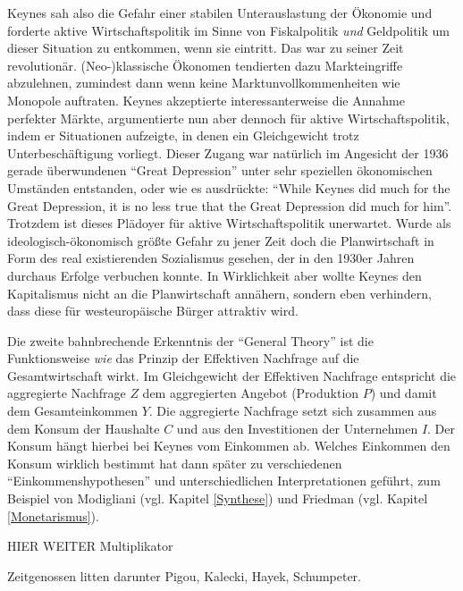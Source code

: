 Keynes sah also die Gefahr einer stabilen Unterauslastung der Ökonomie und forderte aktive Wirtschaftspolitik im Sinne von Fiskalpolitik \textit{und} Geldpolitik um dieser Situation zu entkommen, wenn sie eintritt. Das war zu seiner Zeit revolutionär. (Neo-)klassische Ökonomen tendierten dazu Markteingriffe abzulehnen, zumindest dann wenn keine Marktunvollkommenheiten wie Monopole auftraten. Keynes akzeptierte interessanterweise die Annahme perfekter Märkte, argumentierte nun aber dennoch für aktive Wirtschaftspolitik, indem er Situationen aufzeigte, in denen ein Gleichgewicht trotz Unterbeschäftigung vorliegt. Dieser Zugang war natürlich im Angesicht der 1936 gerade überwundenen "`Great Depression"' unter sehr speziellen ökonomischen Umständen entstanden, oder wie \textcite[S. 199]{Samuelson1946} es ausdrückte: "`While Keynes did much for the Great Depression, it is no less true that the Great Depression did much for him"'. Trotzdem ist dieses Plädoyer für aktive Wirtschaftspolitik unerwartet. Wurde als ideologisch-ökonomisch größte Gefahr zu jener Zeit doch die Planwirtschaft in Form des real existierenden Sozialismus gesehen, der in den 1930er Jahren durchaus Erfolge verbuchen konnte. In Wirklichkeit aber wollte Keynes den Kapitalismus nicht an die Planwirtschaft annähern, sondern eben verhindern, dass diese für westeuropäische Bürger attraktiv wird.

Die zweite bahnbrechende Erkenntnis der "`General Theory"' ist die Funktionsweise \textit{wie} das Prinzip der Effektiven Nachfrage auf die Gesamtwirtschaft wirkt. Im Gleichgewicht der Effektiven Nachfrage entspricht die aggregierte Nachfrage $Z$ dem aggregierten Angebot (Produktion $P$) und damit dem Gesamteinkommen $Y$. Die aggregierte Nachfrage setzt sich zusammen aus dem Konsum der Haushalte $C$ und aus den Investitionen der Unternehmen $I$. Der Konsum hängt hierbei bei Keynes vom Einkommen ab. Welches Einkommen den Konsum wirklich bestimmt hat dann später zu verschiedenen "`Einkommenshypothesen"' und unterschiedlichen Interpretationen geführt, zum Beispiel von Modigliani (vgl. Kapitel \ref{Synthese}) und Friedman (vgl. Kapitel \ref{Monetarismus}). 

HIER WEITER Multiplikator \parencite[S. 59]{Snowdon2005}






Zeitgenossen litten darunter Pigou, Kalecki, Hayek, Schumpeter. 








